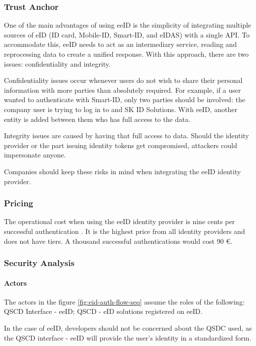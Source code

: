 \subsubsection{Trust Anchor}

One of the main advantages of using eeID is the simplicity of integrating multiple sources of eID (ID card, Mobile-ID, Smart-ID, and eIDAS) with a single API. To accommodate this, eeID needs to act as an intermediary service, reading and reprocessing data to create a unified response. With this approach, there are two issues: confidentiality and integrity.

Confidentiality issues occur whenever users do not wish to share their personal information with more parties than absolutely required. For example, if a user wanted to authenticate with Smart-ID, only two parties should be involved: the company user is trying to log in to and SK ID Solutions. With eeID, another entity is added between them who has full access to the data.

Integrity issues are caused by having that full access to data. Should the identity provider or the part issuing identity tokens get compromised, attackers could impersonate anyone.

Companies should keep these risks in mind when integrating the eeID identity provider.

\subsubsection{Pricing}

The operational cost when using the eeID identity provider is nine cents per successful authentication \cite{eeid-pricing}. It is the highest price from all identity providers and does not have tiers. A thousand successful authentications would cost 90 €.

\subsubsection{Security Analysis}

\paragraph{Actors}

The actors in the figure \ref{fig:eid-auth-flow-seq} assume the roles of the following: QSCD Interface - eeID; QSCD - eID solutions registered on eeID.

In the case of eeID, developers should not be concerned about the QSDC used, as the QSCD interface - eeID will provide the user's identity in a standardized form.

